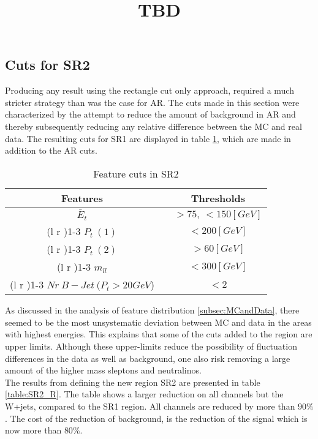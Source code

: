 \documentclass{article}
\begin{document}
\subsection{Cuts for SR2}
Producing any result using the rectangle cut only approach, required a much stricter strategy than was the case for AR. The cuts made in this section were characterized by the attempt to reduce the amount of background in AR and thereby subsequently reducing any relative difference between the MC and real data. The resulting cuts for SR1 are displayed in table \ref{table:AR}, which are made in addition to the AR cuts. \\
\bgroup
\title{TBD}
{\tabcolsep=20pt
\begin{table}
    \caption{Feature cuts in SR2}
    \label{table:AR}
    \centering 
    \begin{threeparttable}
    \begin{tabular}{ccc}
    \textbf{Features} & & \textbf{Thresholds}\\
     \midrule\midrule
    $\bar{E}_t$   & &  $ > 75, \ < 150[GeV]$  \\%
    \cmidrule(l  r ){1-3}
     $P_t \ (1)$ & &  $< 200[GeV]$  \\ 
    \cmidrule(l r ){1-3}
     $P_t \ (2)$ & & $> 60[GeV]$  \\ 
    \cmidrule(l r ){1-3}
    $m_{ll}$ & & $< 300[GeV]$  \\
    \cmidrule(l r ){1-3}
    $Nr\ B-Jet\  (P_t>20GeV$) & & $< 2$  \\ 
    \midrule\midrule
    \end{tabular}
    \end{threeparttable}
\end{table}
}
\egroup
As discussed in the analysis of feature distribution \ref{subsec:MCandData}, there seemed to be the most unsystematic deviation between MC and data in the areas with highest energies. This explains that some of the cuts added to the region are upper limits. Although these upper-limits reduce the possibility of fluctuation differences in the data as well as background, one also risk removing a large amount of the higher mass sleptons and neutralinos. 
\\
The results from defining the new region SR2 are presented in table \ref{table:SR2_R}. The table shows a larger reduction on all channels but the W+jets, compared to the SR1 region. All channels are reduced by more than $90\%$. The cost of the reduction of background, is the reduction of the signal which is now more than $80\%$.
\end{document}
